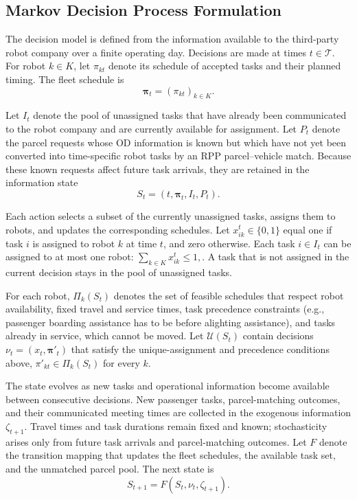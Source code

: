 \documentclass[11pt,oneside]{article}
\begin{document}
\subsection{Markov Decision Process Formulation}\label{subsec:mdp_formulation}
The decision model is defined from the information available to the
third-party robot company over a finite operating day. Decisions are made at
times \(t\in\mathcal T\). For robot \(k\in K\), let \(\pi_{kt}\) denote its
schedule of accepted tasks and their planned timing.
The fleet schedule is
\[
\boldsymbol{\pi}_t=(\pi_{kt})_{k\in K}.
\]

Let \(I_t\) denote the pool of unassigned tasks that have already been communicated to
the robot company and are currently available for assignment.  Let \(P_t\) denote the parcel requests whose OD information
is known but which have not yet been converted into time-specific robot tasks
by an RPP parcel--vehicle match. Because these known requests affect future
task arrivals, they are retained in the information state
\[
S_t=\left(t,\boldsymbol{\pi}_t,I_t,P_t\right).
\]

Each action selects a subset of the currently unassigned tasks, assigns them to
robots, and updates the corresponding schedules. Let
\(x_{ik}^t\in\{0,1\}\) equal one if task \(i\) is assigned to robot \(k\) at
time \(t\), and zero otherwise. Each task $i\in I_t$ can be assigned to at most one robot:
\(
\sum_{k\in K}x_{ik}^t\leq 1,
\).
A task that is not assigned in the current decision stays in the pool of unassigned tasks.



For each robot, \(\Pi_k(S_t)\) denotes the set of feasible schedules that respect
robot availability, fixed travel and service times, task precedence constraints
(e.g., passenger boarding assistance has to be before alighting assistance),
and tasks already in service, which cannot be moved. Let
\(\mathcal U(S_t)\) contain decisions $\nu_t=(x_t,\boldsymbol{\pi}'_t)$
that satisfy the unique-assignment and precedence conditions above,
\(\pi'_{kt}\in\Pi_k(S_t)\) for every \(k\).


The state evolves as new tasks and operational information become available
between consecutive decisions. New passenger tasks, parcel-matching outcomes,
and their communicated meeting times are collected in the exogenous
information \(\zeta_{t+1}\). Travel times and task durations remain fixed and
known; stochasticity arises only from future task arrivals and parcel-matching
outcomes. Let \(F\) denote the transition mapping that
updates the fleet schedules, the available task set, and the unmatched parcel
pool. The next state is
\[
S_{t+1}=F(S_t,\nu_t,\zeta_{t+1}).
\]
\end{document}
